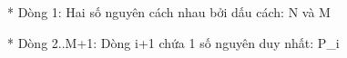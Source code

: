 * Dòng 1: Hai số nguyên cách nhau bởi dấu cách: N và M  

   * Dòng 2..M+1: Dòng i+1 chứa 1 số nguyên duy nhất: P\_i